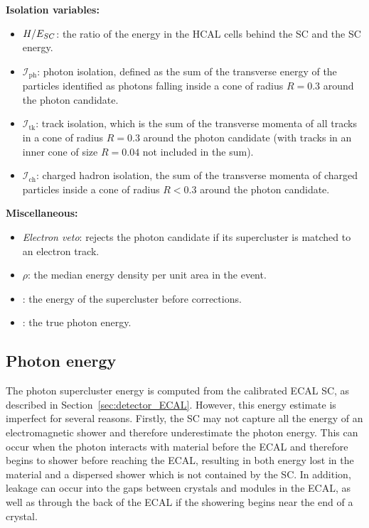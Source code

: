 \textbf{Isolation variables:}
\begin{itemize}[noitemsep]
  \item $H/E_{SC}$: the ratio of the energy in the HCAL cells behind the SC 
    and the SC energy.
  \item \emph{$\mathcal{I}_{\text{ph}}$}: 
    photon isolation,
    defined as the sum of the transverse energy of the particles
    identified as photons falling inside a cone of radius
    $R=0.3$
    around the photon candidate.
  \item \emph{$\mathcal{I}_{\text{tk}}$}: 
    track isolation, which is 
    the sum of the transverse momenta
    of all tracks in a cone of radius $R=0.3$
    around the photon candidate (with tracks in an
    inner cone of size $R=0.04$ not included in the sum).
  \item \emph{$\mathcal{I}_{\text{ch}}$}: 
    charged hadron isolation,
    the sum of the transverse momenta of
    charged particles inside a cone of radius $R<0.3$ around the
    photon candidate.
\end{itemize}

\textbf{Miscellaneous:}
\begin{itemize}[noitemsep]
  \item \emph{Electron veto}: rejects the photon candidate if its 
    supercluster is matched to an electron track.
  \item \emph{$\rho$}: the median energy  density per unit area in the event.
  \item \emph{\Eraw}: the energy of the supercluster before corrections.
  \item \emph{\Etrue}: the true photon energy.
\end{itemize}

\subsection{Photon energy}
\label{sec:objects_PhotonEnergy}

The photon supercluster energy is computed from the calibrated ECAL SC, as described in Section~\ref{sec:detector_ECAL}.
However, this energy estimate is imperfect for several reasons.
Firstly, the SC may not capture all the energy of an electromagnetic shower and therefore underestimate the photon energy.
This can occur when the photon interacts with material before the ECAL and therefore begins to shower before reaching the ECAL, 
resulting in both energy lost in the material and a dispersed shower which is not contained by the SC.
In addition, leakage can occur into the gaps between crystals and modules in the ECAL, 
as well as through the back of the ECAL if the showering begins near the end of a crystal.

